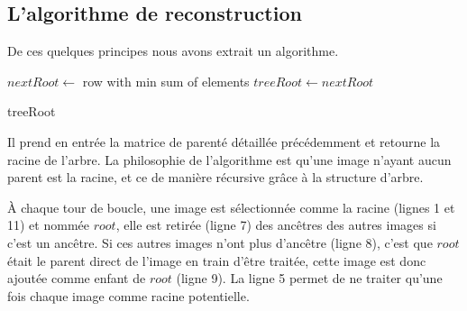 \documentclass[utf8]{stageM2R} %
\begin{document}
\subsection{L'algorithme de reconstruction}
De ces quelques principes nous avons extrait un algorithme. \vspace{5mm}

\begin{algorithm}[H]
  \LinesNumbered
  \BlankLine
  $nextRoot \leftarrow$ row with min sum of elements\;
  $treeRoot \leftarrow nextRoot$\;
  \BlankLine

  \KwRet treeRoot
\end{algorithm}
\vspace{5mm}

Il prend en entrée la matrice de parenté détaillée précédemment et retourne la racine de l'arbre. La philosophie de l'algorithme est qu'une image n'ayant aucun parent est la racine, et ce de manière récursive grâce à la structure d'arbre.



À chaque tour de boucle, une image est sélectionnée comme la racine (lignes 1 et 11) et nommée $root$, elle est retirée (ligne 7) des ancêtres des autres images si c'est un ancêtre. Si ces autres images n'ont plus d'ancêtre (ligne 8), c'est que $root$ était le parent direct de l'image en train d'être traitée, cette image est donc ajoutée comme enfant de $root$ (ligne 9). La ligne 5 permet de ne traiter qu'une fois chaque image comme racine potentielle.
\end{document}
